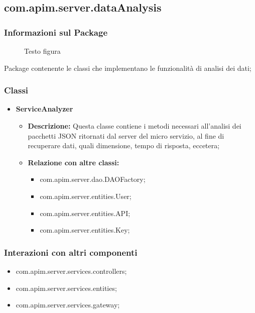 {{      \subsection{com.apim.server.dataAnalysis}{
  \subsubsection{Informazioni sul Package}
    \begin{figure}[ht]
      \centering
      \caption{Testo figura}
      \label{Testo figura}
    \end{figure}
    Package  contenente le classi che implementano le funzionalità di analisi dei dati;
    \subsubsection{Classi}
    \begin{itemize} \itemsep1pt
    \item \textbf{ServiceAnalyzer}
    \begin{itemize}
    \item \textbf{Descrizione:} Questa classe contiene i metodi necessari all'analisi dei pacchetti JSON ritornati dal server del micro servizio, al fine di recuperare dati, quali dimensione, tempo di risposta, eccetera;
    \item \textbf{Relazione con altre classi:}
    \begin{itemize}
    \item com.apim.server.dao.DAOFactory;
    \item com.apim.server.entities.User;
    \item com.apim.server.entities.API;
    \item com.apim.server.entities.Key;
    \end{itemize}
    \end{itemize}
    \end{itemize}
    \subsubsection{Interazioni con altri componenti}
    \begin{itemize}
    \item com.apim.server.services.controllers;
    \item com.apim.server.services.entities;
    \item com.apim.server.services.gateway;
    \end{itemize}
  }
}}
